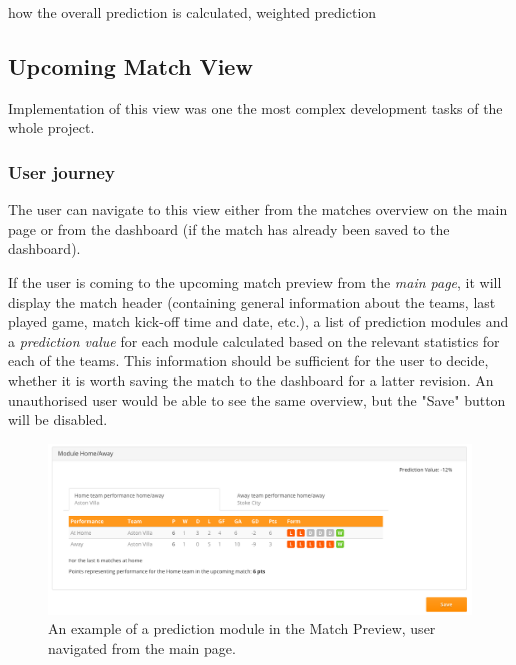  

how the overall prediction is calculated, weighted prediction

\subsection{Upcoming Match View}
\label{subsec:implementupcomingmatchview}

Implementation of this view was one the most complex development tasks of the whole project.

\subsubsection{User journey}
\label{subsec:upcomingmatchviewuserjourney}

The user can navigate to this view either from the matches overview on the main page or from the dashboard (if the match has already been saved to the dashboard).

 If the user is coming to the upcoming match preview from the \emph{main page}, it will display the match header (containing general information about the teams, last played game, match kick-off time and date, etc.), a list of prediction modules and a \emph{prediction value} for each module calculated based on the relevant statistics for each of the teams. This information should be sufficient for the user to decide, whether it is worth saving the match to the dashboard for a latter revision. An unauthorised user would be able to see the same overview, but the "Save" button will be disabled. 

\begin{figure}[H]
\begin{center}
\includegraphics[width=.90\linewidth,natwidth=610,natheight=642]{impl/images/matchoverviewex_from_main_page}
\caption{An example of a prediction module in the Match Preview, user navigated from the main page.} \label{fig:using: matchoverviewex_from_main_page}
\end{center}
\end{figure}

